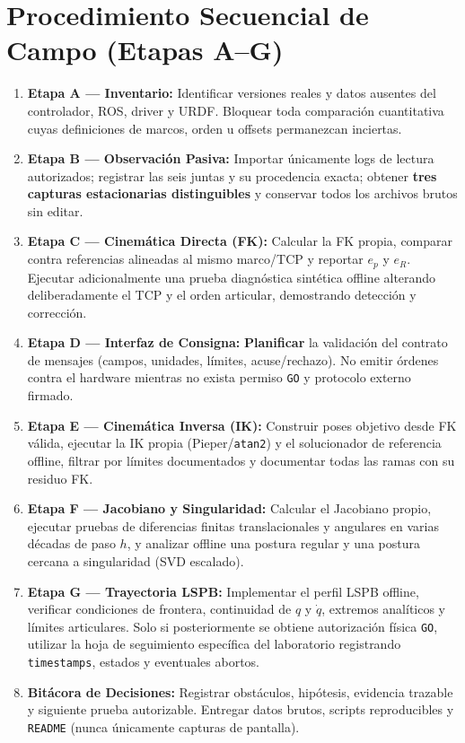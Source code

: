 \documentclass[10.5pt, a4paper]{article}
\begin{document}
\section{Procedimiento Secuencial de Campo (Etapas A–G)}
\begin{enumerate}[leftmargin=*, itemsep=3pt]
    \item \textbf{Etapa A — Inventario:} Identificar versiones reales y datos ausentes del controlador, ROS, driver y URDF. Bloquear toda comparación cuantitativa cuyas definiciones de marcos, orden u offsets permanezcan inciertas.
    \item \textbf{Etapa B — Observación Pasiva:} Importar únicamente logs de lectura autorizados; registrar las seis juntas y su procedencia exacta; obtener \textbf{tres capturas estacionarias distinguibles} y conservar todos los archivos brutos sin editar.
    \item \textbf{Etapa C — Cinemática Directa (FK):} Calcular la FK propia, comparar contra referencias alineadas al mismo marco/TCP y reportar $e_p$ y $e_R$. Ejecutar adicionalmente una prueba diagnóstica sintética offline alterando deliberadamente el TCP y el orden articular, demostrando detección y corrección.
    \item \textbf{Etapa D — Interfaz de Consigna:} \textbf{Planificar} la validación del contrato de mensajes (campos, unidades, límites, acuse/rechazo). No emitir órdenes contra el hardware mientras no exista permiso \texttt{GO} y protocolo externo firmado.
    \item \textbf{Etapa E — Cinemática Inversa (IK):} Construir poses objetivo desde FK válida, ejecutar la IK propia (Pieper/\texttt{atan2}) y el solucionador de referencia offline, filtrar por límites documentados y documentar todas las ramas con su residuo FK.
    \item \textbf{Etapa F — Jacobiano y Singularidad:} Calcular el Jacobiano propio, ejecutar pruebas de diferencias finitas translacionales y angulares en varias décadas de paso $h$, y analizar offline una postura regular y una postura cercana a singularidad (SVD escalado).
    \item \textbf{Etapa G — Trayectoria LSPB:} Implementar el perfil LSPB offline, verificar condiciones de frontera, continuidad de $q$ y $\dot{q}$, extremos analíticos y límites articulares. Solo si posteriormente se obtiene autorización física \texttt{GO}, utilizar la hoja de seguimiento específica del laboratorio registrando \texttt{timestamps}, estados y eventuales abortos.
    \item \textbf{Bitácora de Decisiones:} Registrar obstáculos, hipótesis, evidencia trazable y siguiente prueba autorizable. Entregar datos brutos, scripts reproducibles y \texttt{README} (nunca únicamente capturas de pantalla).
\end{enumerate}
\end{document}
